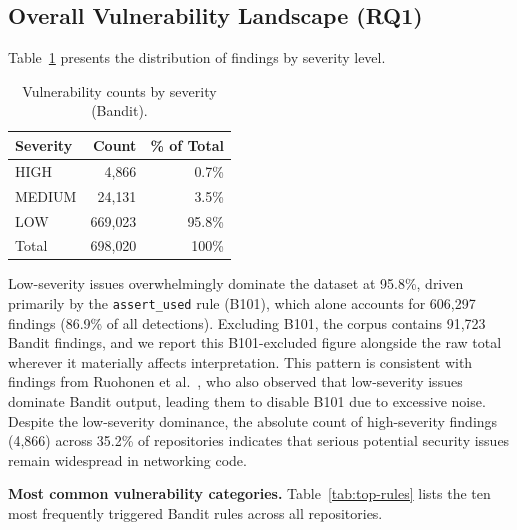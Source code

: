 \documentclass[sigconf,authordraft]{acmart}
\begin{document}
\subsection{Overall Vulnerability Landscape (RQ1)}

Table~\ref{tab:severity-bandit} presents the distribution of findings
by severity level.

\begin{table}[h]
  \caption{Vulnerability counts by severity (Bandit).}
  \label{tab:severity-bandit}
  \begin{tabular}{lrr}
    \toprule
    Severity & Count & \% of Total \\
    \midrule
    HIGH   &   4{,}866 &  0.7\% \\
    MEDIUM &  24{,}131 &  3.5\% \\
    LOW    & 669{,}023 & 95.8\% \\
    \midrule
    Total  & 698{,}020 & 100\% \\
    \bottomrule
  \end{tabular}
\end{table}

Low-severity issues overwhelmingly dominate the dataset at 95.8\%,
driven primarily by the \texttt{assert\_used} rule (B101), which alone
accounts for 606{,}297 findings (86.9\% of all detections). Excluding
B101, the corpus contains 91{,}723 Bandit findings, and we report this
B101-excluded figure alongside the raw total wherever it materially
affects interpretation. This pattern is consistent with findings from
Ruohonen et al.~\cite{Ruohonen2021}, who also observed that
low-severity issues dominate Bandit output, leading them to disable
B101 due to excessive noise. Despite the low-severity dominance, the
absolute count of high-severity findings (4{,}866) across 35.2\% of
repositories indicates that serious potential security issues remain
widespread in networking code.

\textbf{Most common vulnerability categories.}
Table~\ref{tab:top-rules} lists the ten most frequently triggered
Bandit rules across all repositories.
\end{document}
